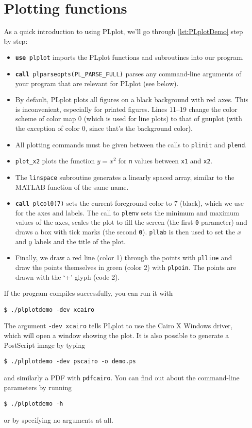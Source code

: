 \documentclass[openany,oneside]{report}
\newcommand{\keyword}[1]{\texttt{\bfseries\color{DarkBlue}#1}}
\begin{document}
\section{Plotting functions}

As a quick introduction to using PLplot, we'll go through \autoref{lst:PLplotDemo} step by step:


\begin{itemize}
  \item \texttt{\keyword{use} plplot} imports the PLplot functions and subroutines into our program.
  \item \texttt{\keyword{call} plparseopts(PL\_PARSE\_FULL)} parses any command-line arguments of your program that are relevant for PLplot (see below).
  \item By default, PLplot plots all figures on a black background with red axes.
    This is inconvenient, especially for printed figures.
    Lines 11--19 change the color scheme of color map 0 (which is used for line plots) to that of gnuplot (with the exception of color 0, since that's the background color).
  \item All plotting commands must be given between the calls to \texttt{plinit} and \texttt{plend}.
  \item \texttt{plot\_x2} plots the function $y=x^2$ for \texttt{n} values between \texttt{x1} and \texttt{x2}.
  \item The \texttt{linspace} subroutine generates a linearly spaced array, similar to the MATLAB function of the same name.
  \item \texttt{\keyword{call} plcol0(7)} sets the current foreground color to 7 (black), which we use for the axes and labels.
    The call to \texttt{plenv} sets the minimum and maximum values of the axes, scales the plot to fill the screen (the first \texttt{0} parameter) and draws a box with tick marks (the second \texttt{0}).
    \texttt{pllab} is then used to set the $x$ and $y$ labels and the title of the plot.
  \item Finally, we draw a red line (color 1) through the points with \texttt{plline} and draw the points themselves in green (color 2) with \texttt{plpoin}.
    The points are drawn with the `+' glyph (code 2).
\end{itemize}
If the program compiles successfully, you can run it with
\begin{verbatim}
$ ./plplotdemo -dev xcairo
\end{verbatim}
The argument \texttt{-dev xcairo} tells PLplot to use the Cairo X Windows driver, which will open a window showing the plot.
It is also possible to generate a PostScript image by typing
\begin{verbatim}
$ ./plplotdemo -dev pscairo -o demo.ps
\end{verbatim}
and similarly a PDF with \texttt{pdfcairo}. You can find out about the command-line parameters by running
\begin{verbatim}
$ ./plplotdemo -h
\end{verbatim}
or by specifying no arguments at all.
\end{document}
